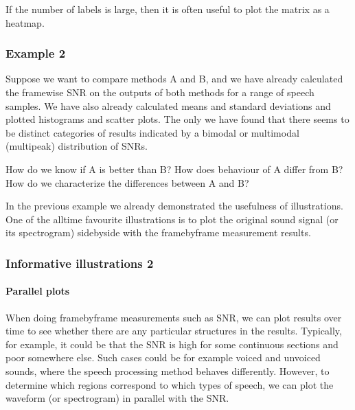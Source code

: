 \documentclass[letterpaper,10pt,english]{jupyterBook}
\begin{document}
\sphinxAtStartPar
If the number of labels is large, then it is often useful to plot the
matrix as a heat\sphinxhyphen{}map.


\subsubsection{Example 2}
\label{\detokenize{Evaluation/Analysis_of_evaluation_results:example-2}}
\sphinxAtStartPar
Suppose we want to compare methods A and B, and we have already
calculated the frame\sphinxhyphen{}wise SNR on the outputs of both methods for a range
of speech samples. We have also already calculated means and standard
deviations and plotted histograms and scatter plots. The only we have
found that there seems to be distinct categories of results indicated by
a bimodal or multi\sphinxhyphen{}modal (multipeak) distribution of SNRs.

\sphinxAtStartPar
How do we know if A is better than B? How does behaviour of A differ
from B? How do we characterize the differences between A and B?

\sphinxAtStartPar
{} In the previous example we already demonstrated the
usefulness of illustrations. One of the all\sphinxhyphen{}time favourite illustrations
is to plot the original sound signal (or its spectrogram) side\sphinxhyphen{}by\sphinxhyphen{}side
with the frame\sphinxhyphen{}by\sphinxhyphen{}frame measurement results.


\subsubsection{Informative illustrations 2}
\label{\detokenize{Evaluation/Analysis_of_evaluation_results:informative-illustrations-2}}

\paragraph{Parallel plots}
\label{\detokenize{Evaluation/Analysis_of_evaluation_results:parallel-plots}}
\sphinxAtStartPar
When doing frame\sphinxhyphen{}by\sphinxhyphen{}frame measurements such as SNR, we can plot results
over time to see whether there are any particular structures in the
results. Typically, for example, it could be that the SNR is high for
some continuous sections and poor somewhere else. Such cases could be
for example voiced and unvoiced sounds, where the speech processing
method behaves differently. However, to determine which regions
correspond to which types of speech, we can plot the waveform (or
spectrogram) in parallel with the SNR.
\end{document}
